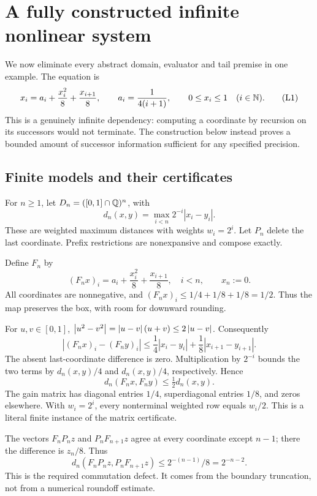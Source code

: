 \section{A fully constructed infinite nonlinear system}
\label{sec:lattice}

We now eliminate every abstract domain, evaluator and tail premise in
one example. The equation is
\[
 x_i=a_i+\frac{x_i^2}{8}+\frac{x_{i+1}}8,
 \qquad a_i=\frac1{4(i+1)},\qquad 0\le x_i\le1
 \quad(i\in\mathbb N).
 \label{eq:lattice-system}\tag{L1}
\]
This is a genuinely infinite dependency: computing a coordinate by
recursion on its successors would not terminate. The construction
below instead proves a bounded amount of successor information
sufficient for any specified precision.

\subsection{Finite models and their certificates}

For \(n\ge1\), let \(D_n=([0,1]\cap\mathbb Q)^n\), with
\[
 d_n(x,y)=\max_{i<n}2^{-i}|x_i-y_i|.
\]
These are weighted maximum distances with weights \(w_i=2^i\).
Let \(P_n\) delete the last coordinate. Prefix restrictions are
nonexpansive and compose exactly.

Define \(F_n\) by
\[
 (F_nx)_i=a_i+\frac{x_i^2}{8}+\frac{x_{i+1}}8,
 \quad i<n,
 \qquad x_n:=0.
 \label{eq:lattice-finite}\tag{L2}
\]
All coordinates are nonnegative, and
\((F_nx)_i\le1/4+1/8+1/8=1/2\). Thus the map preserves the box,
with room for downward rounding.

For \(u,v\in[0,1]\),
\(\left|u^2-v^2\right|=\left|u-v\right|(u+v)\le2\left|u-v\right|\).
Consequently
\[
 |(F_nx)_i-(F_ny)_i|
 \le\frac14|x_i-y_i|+\frac18|x_{i+1}-y_{i+1}|.
\]
The absent last-coordinate difference is zero. Multiplication by
\(2^{-i}\) bounds the two terms by \(d_n(x,y)/4\) and
\(d_n(x,y)/4\), respectively. Hence
\[
 d_n(F_nx,F_ny)\le\tfrac12d_n(x,y).             \tag{L3}
\]
The gain matrix has diagonal entries \(1/4\), superdiagonal entries
\(1/8\), and zeros elsewhere. With \(w_i=2^i\), every nonterminal
weighted row equals \(w_i/2\). This is a literal finite instance of
the matrix certificate.

The vectors \(F_nP_nz\) and \(P_nF_{n+1}z\) agree at every
coordinate except \(n-1\); there the difference is \(z_n/8\).
Thus
\[
 d_n(F_nP_nz,P_nF_{n+1}z)
 \le2^{-(n-1)}/8=2^{-n-2}.                     \tag{L4}
\]
This is the required commutation defect. It comes from the boundary
truncation, not from a numerical roundoff estimate.

